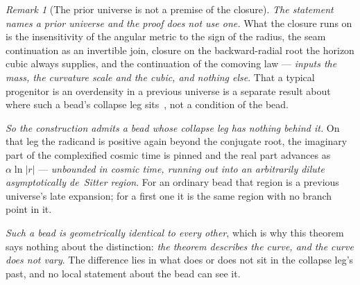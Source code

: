\documentclass[11pt,a4paper]{article}
\theoremstyle{plain}
\theoremstyle{definition}
\theoremstyle{remark}
\newtheorem{remark}{Remark}
\begin{document}
\begin{remark}[The prior universe is not a premise of the closure]\label{rem:head-admissible}
\emph{The statement names a prior universe and the proof does not use one.} What the closure runs on is the
insensitivity of the angular metric to the sign of the radius, the seam continuation as an invertible join,
closure on the backward-radial root the horizon cubic always supplies, and the continuation of the comoving
law --- \emph{inputs the mass, the curvature scale and the cubic, and nothing else}. That a typical
progenitor is an overdensity in a previous universe is a separate result about where such a bead's collapse
leg sits~\cite{JanzenCosmogenesis}, not a condition of the bead.

\emph{So the construction admits a bead whose collapse leg has nothing behind it.} On that leg the radicand
is positive again beyond the conjugate root, the imaginary part of the complexified cosmic time is pinned and
the real part advances as $\alpha\ln|r|$ --- \emph{unbounded in cosmic time, running out into an arbitrarily
dilute asymptotically de~Sitter region}. For an ordinary bead that region is a previous universe's late
expansion; for a first one it is the same region with no branch point in it.

\emph{Such a bead is geometrically identical to every other}, which is why this theorem says nothing about
the distinction: \emph{the theorem describes the curve, and the curve does not vary}. The difference lies in
what does or does not sit in the collapse leg's past, and no local statement about the bead can see it.
\end{remark}
\end{document}
